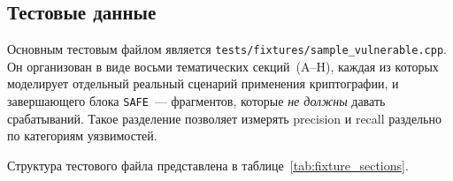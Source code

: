 \subsection{Тестовые данные}

Основным тестовым файлом является
\texttt{tests/\allowbreak fixtures/\allowbreak sample\_vulnerable.cpp}.
Он организован в виде восьми тематических секций~(A--H), каждая из
которых моделирует отдельный реальный сценарий применения
криптографии, и завершающего блока \texttt{SAFE}~--- фрагментов,
которые \emph{не должны} давать срабатываний.
Такое разделение позволяет измерять precision и recall раздельно
по категориям уязвимостей.

Структура тестового файла представлена в
таблице~\ref{tab:fixture_sections}.

